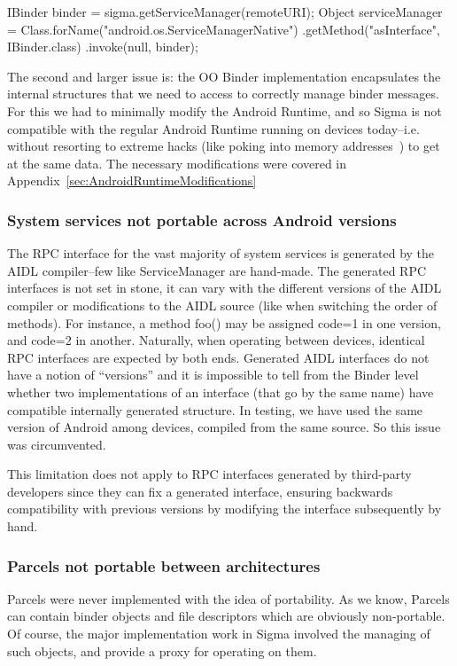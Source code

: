 \documentclass[prodmode]{acmlarge}
\begin{document}
\begin{snippet}
IBinder binder = sigma.getServiceManager(remoteURI);
Object serviceManager = Class.forName("android.os.ServiceManagerNative")
                    .getMethod("asInterface", IBinder.class)
                    .invoke(null, binder);
\end{snippet}

The second and larger issue is: the OO Binder implementation encapsulates the internal structures that we need to access to correctly manage binder messages. For this we had to minimally modify the Android Runtime, and so Sigma is not compatible with the regular Android Runtime running on devices today--i.e. without resorting to extreme hacks (like poking into memory addresses~\cite{FacebookDalvikHacks}) to get at the same data. The necessary modifications were covered in Appendix~\ref{sec:AndroidRuntimeModifications}

\subsubsection{System services not portable across Android versions}
The RPC interface for the vast majority of system services is generated by the AIDL compiler--few like ServiceManager are hand-made. The generated RPC interfaces is not set in stone, it can vary with the different versions of the AIDL compiler or modifications to the AIDL source (like when switching the order of methods). For instance, a method foo() may be assigned code=1 in one version, and code=2 in another. Naturally, when operating between devices, identical RPC interfaces are expected by both ends. Generated AIDL interfaces do not have a notion of ``versions'' and it is impossible to tell from the Binder level whether two implementations of an interface (that go by the same name) have compatible internally generated structure. In testing, we have used the same version of Android among devices, compiled from the same source. So this issue was circumvented.

This limitation does not apply to RPC interfaces generated by third-party developers since they can fix a generated interface, ensuring backwards compatibility with previous versions by modifying the interface subsequently by hand.

\subsubsection{Parcels not portable between architectures}
Parcels were never implemented with the idea of portability. As we know, Parcels can contain binder objects and file descriptors which are obviously non-portable. Of course, the major implementation work in Sigma involved the managing of such objects, and provide a proxy for operating on them.
\end{document}
